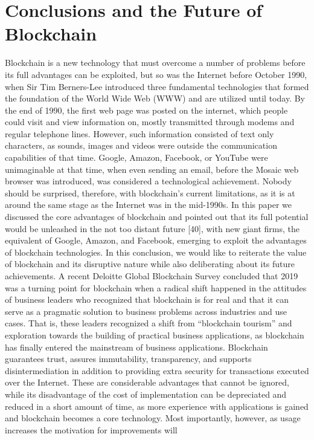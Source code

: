 \section{Conclusions and the Future of Blockchain}
Blockchain is a new technology that must overcome a number of problems before its full advantages
can be exploited, but so was the Internet before October 1990, when Sir Tim Berners-Lee introduced
three fundamental technologies that formed the foundation of the World Wide Web (WWW) and are
utilized until today. By the end of 1990, the first web page was posted on the internet, which people
could visit and view information on, mostly transmitted through modems and regular telephone
lines. However, such information consisted of text only characters, as sounds, images and videos
were outside the communication capabilities of that time. Google, Amazon, Facebook, or YouTube
were unimaginable at that time, when even sending an email, before the Mosaic web browser was
introduced, was considered a technological achievement. Nobody should be surprised, therefore, with
blockchain’s current limitations, as it is at around the same stage as the Internet was in the mid-1990s.
In this paper we discussed the core advantages of blockchain and pointed out that its full potential
would be unleashed in the not too distant future [40], with new giant firms, the equivalent of Google,
Amazon, and Facebook, emerging to exploit the advantages of blockchain technologies. In this
conclusion, we would like to reiterate the value of blockchain and its disruptive nature while also
deliberating about its future achievements. A recent Deloitte Global Blockchain Survey  concluded
that 2019 was a turning point for blockchain when a radical shift happened in the attitudes of business
leaders who recognized that blockchain is for real and that it can serve as a pragmatic solution to
business problems across industries and use cases. That is, these leaders recognized a shift from
“blockchain tourism” and exploration towards the building of practical business applications, as
blockchain has finally entered the mainstream of business applications. Blockchain guarantees trust,
assures immutability, transparency, and supports disintermediation in addition to providing extra
security for transactions executed over the Internet. These are considerable advantages that cannot
be ignored, while its disadvantage of the cost of implementation can be depreciated and reduced in
a short amount of time, as more experience with applications is gained and blockchain becomes a
core technology. Most importantly, however, as usage increases the motivation for improvements will
